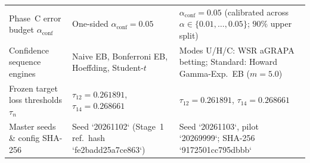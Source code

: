 \begin{table}[htbp]
\begin{tabular}{@{}p{4.4cm} p{5.6cm} p{6.8cm}@{}}
Phase~C error budget $\alpha_{\mathrm{conf}}$ & One-sided $\alpha_{\mathrm{conf}} = 0.05$ & $\alpha_{\mathrm{conf}} = 0.05$ (calibrated across $\alpha \in \{0.01, \dots, 0.05\}$; $90\%$ upper split) \\
Confidence sequence engines & Naive EB, Bonferroni EB, Hoeffding, Student-$t$ & Modes U/H/C: WSR aGRAPA betting; Standard: Howard Gamma-Exp.\ EB ($m=5.0$) \\
Frozen target loss thresholds $\tau_n$ & $\tau_{12} = 0.261891$, $\tau_{14} = 0.268661$ & $\tau_{12} = 0.261891$, $\tau_{14} = 0.268661$ \\
Master seeds \& config SHA-256 & Seed `20261102` (Stage~1 ref.\ hash `fe2badd25a7ce863`) & Seed `20261103`, pilot `20269999`; SHA-256 `9172501cc795dbbb` \\
\bottomrule
\end{tabular}
\end{table}
